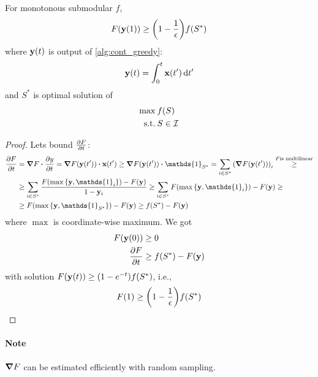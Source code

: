 \begin{theorem}
	For monotonous submodular $f$,
	\begin{align}
	F(\vb{y}(1)) \geq \qty(1-\frac{1}{\epsilon})f(S^*)
	\end{align}
	where $\vb{y}(t)$ is output of \vref{alg:cont_greedy}:
	\begin{align}
	\vb{y}(t) = \int_0^t \vb{x}(t') \dd{t'}
	\end{align}
	and $S^*$ is optimal solution of
	\begin{align}
	\max \: & f(S)\\
	\text{s.t.} \: & S\in \mathcal{I}
	\end{align}
	\begin{proof}
		Lets bound $\pdv{F}{t} (\vb{y}(t'))$:
		\begin{align}
		\pdv{F}{t} (\vb{y}(t')) &=  \grad{F} \vdot \pdv{y}{t} =  \grad{F\qty(\vb{y}(t'))} \vdot \vb{x}(t') \geq \grad{F\qty(\vb{y}(t'))} \vdot \mathds{1}_{S^*}= \sum_{i \in S^*} \qty(\grad{F\qty(\vb{y}(t'))})_i \stackrel{F \text{is multilinear}}{\geq}\\&\geq \sum_{i \in S^*} \frac{F\qty(\max\qty{\vb{y}, \mathds{1}_i})-F(\vb{y})}{1-\vb{y}_i} \geq \sum_{i \in S^*} F\qty(\max\qty{\vb{y}, \mathds{1}_i})-F(\vb{y}) \geq\\&\geq F\qty(\max\qty{\vb{y}, \mathds{1}_{S^*}})-F(\vb{y}) \geq f(S^*)-F(\vb{y})
		\end{align}
		where $\max$ is coordinate-wise maximum.
		We got
		\begin{align}
			F(\vb{y}(0)) &\geq 0 \\
			\pdv{F}{t} &\geq f(S^*) - F(\vb{y})
		\end{align}
		with solution $F(\vb{y}(t)) \geq \qty(1-e^{-t}) f(S^*)$, i.e., 
		\begin{align}
		F(1) \geq \qty(1-\frac{1}{\epsilon})f(S^*)
		\end{align}
	\end{proof}
\end{theorem}
\paragraph{Note} $\grad F$ can be estimated efficiently with random sampling.